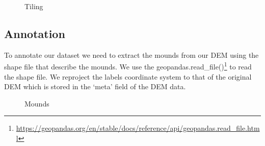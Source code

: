 \documentclass[sigconf,natbib=false]{acmart}
\begin{document}
\begin{figure}[ht]
    \centering
    \caption{Tiling}
\end{figure}
\subsection{Annotation}
To annotate our dataset we need to extract the mounds from our DEM using the shape file that describe the mounds. 
We use the geopandas.read\_file()\footnote{\url{https://geopandas.org/en/stable/docs/reference/api/geopandas.read_file.html}} to read the shape file. We reproject the labels coordinate system to that of the original DEM which is stored in the ‘meta’ field of the DEM data.

\begin{figure}[ht]
    \centering
    \newline
    \caption{Mounds}
\end{figure}
\end{document}
